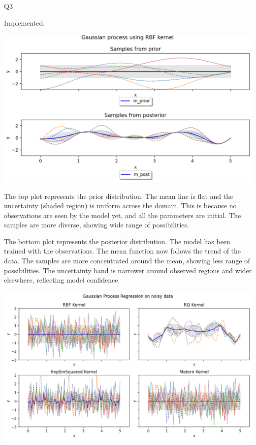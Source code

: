 \question Q3\droppoints

\begin{solution}
     Implemented.


    \centerline {
        \includegraphics[width=1\textwidth]{img/prior_posterior}
    }

    The top plot represents the prior distribution.
    The mean line is flat and the uncertainty (shaded region) is uniform across the domain.
    This is because no observations are seen by the model yet, and all the parameters are initial.
    The samples are more diverse, showing wide range of possibilities.

    The bottom plot represents the posterior distribution.
    The model has been trained with the observations.
    The mean function now follows the trend of the data.
    The samples are more concentrated around the mean, showing less range of possibilities.
    The uncertainty band is narrower around observed regions and wider elsewhere, reflecting model confidence.


    \centerline {
        \includegraphics[width=1\textwidth]{img/four_kernels}
    }


\end{solution}
